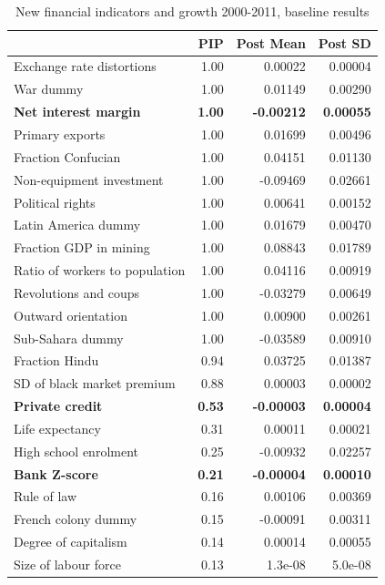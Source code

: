 \begin{refsection}
\begin{table}[!htbp]
	\centering
	\caption{New financial indicators and growth 2000-2011, baseline results}
		\label{ch2tab:BMAgrowth2000-2011}
	\small
	\begin{tabular}{lrrr}
		\toprule
		& PIP & Post Mean & Post SD \\ 
		\midrule
		  Exchange rate distortions & 1.00 & 0.00022 & 0.00004 \\ 
		  War dummy & 1.00 & 0.01149 & 0.00290 \\ 
		  \textbf{Net interest margin} & \textbf{1.00} & \textbf{-0.00212} & \textbf{0.00055} \\ 
		  Primary exports & 1.00 & 0.01699 & 0.00496 \\ 
		  Fraction Confucian & 1.00 & 0.04151 & 0.01130 \\ 
		  Non-equipment investment & 1.00 & -0.09469 & 0.02661 \\ 
		  Political rights & 1.00 & 0.00641 & 0.00152 \\ 
		  Latin America dummy & 1.00 & 0.01679 & 0.00470 \\ 
		  Fraction GDP in mining & 1.00 & 0.08843 & 0.01789 \\ 
		  Ratio of workers to population & 1.00 & 0.04116 & 0.00919 \\ 
		  Revolutions and coups & 1.00 & -0.03279 & 0.00649 \\ 
		  Outward orientation & 1.00 & 0.00900 & 0.00261 \\ 
		  Sub-Sahara dummy & 1.00 & -0.03589 & 0.00910 \\ 
		  Fraction Hindu & 0.94 & 0.03725 & 0.01387 \\ 
		  SD of black market premium & 0.88 & 0.00003 & 0.00002 \\ 
		  \textbf{Private credit} & \textbf{0.53} & \textbf{-0.00003} & \textbf{0.00004} \\ 
		  Life expectancy & 0.31 & 0.00011 & 0.00021 \\ 
		  High school enrolment & 0.25 & -0.00932 & 0.02257 \\ 
		  \textbf{Bank Z-score} & \textbf{0.21} & \textbf{-0.00004} & \textbf{0.00010} \\ 
		  Rule of law & 0.16 & 0.00106 & 0.00369 \\ 
		  French colony dummy & 0.15 & -0.00091 & 0.00311 \\ 
		  Degree of capitalism & 0.14 & 0.00014 & 0.00055 \\ 
		  Size of labour force & 0.13 & 1.3e-08 & 5.0e-08 \\ 

\end{tabular}
\end{table}
\end{refsection}
